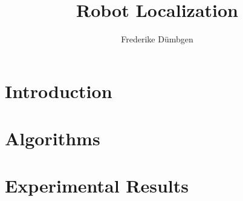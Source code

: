 \documentclass[a4paper]{./pset}
\title{Robot Localization}
\author{Frederike Dümbgen}
\begin{document}
\maketitle

\section{Introduction}
%

\section{Algorithms}
%

\section{Experimental Results}
%


\label{Bibliography}

\begingroup
    \raggedright
    \sloppy
\endgroup 
\end{document}
